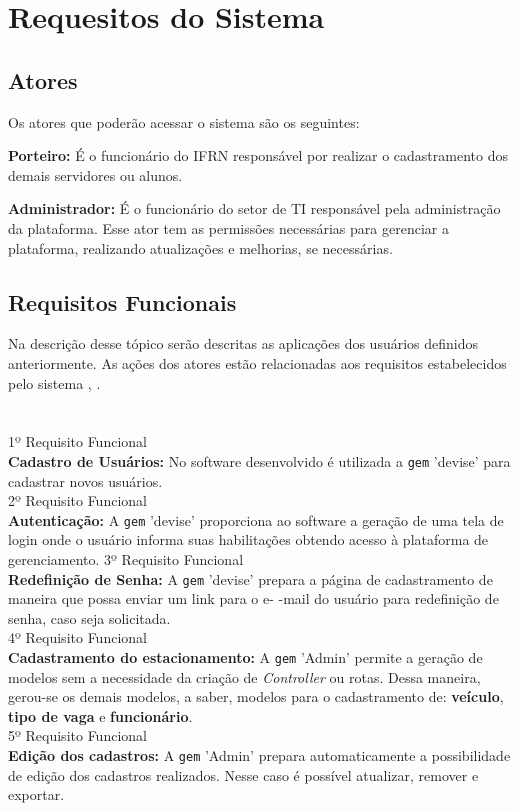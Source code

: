 \section{Requesitos do Sistema}
\subsection{Atores}
Os atores que poderão acessar o sistema são os seguintes:
 
 \textbf{Porteiro:} É o funcionário do IFRN responsável por realizar o cadastramento dos demais servidores ou alunos.
 
 \textbf{Administrador:} É o funcionário do setor de TI responsável pela administração da plataforma. Esse ator tem as permissões necessárias para gerenciar a plataforma, realizando atualizações e melhorias, se necessárias.
 \subsection{ Requisitos Funcionais}
 \label{Requisitos Funcionais}
 Na descrição desse tópico serão descritas as aplicações dos usuários definidos anteriormente.
As ações dos atores estão relacionadas aos requisitos estabelecidos pelo sistema \cite{SOMMERVILLE}, \cite{pressman2016engenharia}.\\\\\\1º Requisito Funcional\\
 \textbf{Cadastro de Usuários:} No software desenvolvido é utilizada a \texttt{gem} 'devise'  para cadastrar novos usuários.\\
 2º Requisito Funcional\\
 \textbf{Autenticação:}  A  \texttt{gem} 'devise' proporciona ao software a geração de uma tela de login onde o usuário
 informa suas habilitações obtendo acesso à plataforma de gerenciamento.
 3º Requisito Funcional\\
 \textbf{Redefinição de Senha:} A  \texttt{gem} 'devise' prepara a página de cadastramento de maneira que possa  enviar um link para o e-
 -mail do usuário para redefinição de senha, caso seja solicitada.\\
  4º Requisito Funcional\\
 \textbf{Cadastramento do estacionamento:}
 A  \texttt{gem} 'Admin' permite a geração de modelos sem a necessidade da criação de \textit{Controller} ou rotas. Dessa maneira, gerou-se os demais modelos, a saber, modelos para o cadastramento de: \textbf{veículo},
 \textbf{tipo de vaga} e
 \textbf{funcionário}.\\
 5º Requisito Funcional\\
 \textbf{Edição dos cadastros:}  A  \texttt{gem} 'Admin' prepara automaticamente a possibilidade de edição dos cadastros realizados. Nesse caso é possível atualizar, remover e exportar.
 

